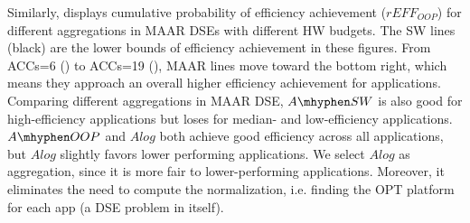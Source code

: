 Similarly,  displays cumulative probability of efficiency achievement ($rEFF_{OOP}$) for different aggregations in MAAR DSEs with different HW budgets. The SW lines (black) are the lower bounds of efficiency achievement in these figures. 
From ACCs=6 () to ACCs=19 (), MAAR lines move toward the bottom right, which means they approach an overall higher efficiency achievement for applications. Comparing different aggregations in MAAR DSE, $A\mhyphen SW$ is also good for high-efficiency applications but loses for median- and low-efficiency applications. 
$A\mhyphen OOP$ and $Alog$ both achieve good efficiency across all applications, but $Alog$ slightly favors lower performing applications. We select $Alog$ as aggregation, since it is more fair to lower-performing applications. Moreover, it eliminates the need to compute the  normalization, i.e. finding the OPT platform for each app (a DSE problem in itself).